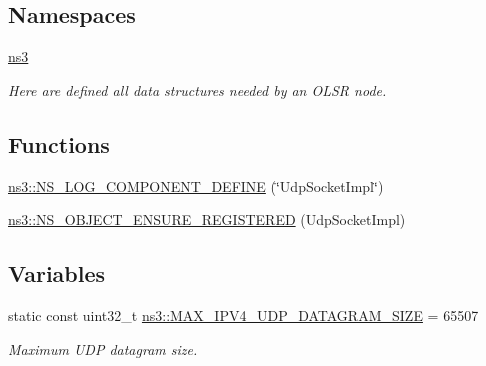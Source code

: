 \subsection*{Namespaces}
\begin{DoxyCompactItemize}
\item 
 \hyperlink{namespacens3}{ns3}
\begin{DoxyCompactList}\small\item\em Here are defined all data structures needed by an O\+L\+SR node. \end{DoxyCompactList}\end{DoxyCompactItemize}
\subsection*{Functions}
\begin{DoxyCompactItemize}
\item 
\hyperlink{namespacens3_a7dd62d2e28bb73942a43c1cc5bb7d31d}{ns3\+::\+N\+S\+\_\+\+L\+O\+G\+\_\+\+C\+O\+M\+P\+O\+N\+E\+N\+T\+\_\+\+D\+E\+F\+I\+NE} (\char`\"{}Udp\+Socket\+Impl\char`\"{})
\item 
\hyperlink{namespacens3_a5bce20e6a77dec0acde9b9850a19ea95}{ns3\+::\+N\+S\+\_\+\+O\+B\+J\+E\+C\+T\+\_\+\+E\+N\+S\+U\+R\+E\+\_\+\+R\+E\+G\+I\+S\+T\+E\+R\+ED} (Udp\+Socket\+Impl)
\end{DoxyCompactItemize}
\subsection*{Variables}
\begin{DoxyCompactItemize}
\item 
static const uint32\+\_\+t \hyperlink{namespacens3_aa58af59d765a0ab7b6d3334147fe60b4}{ns3\+::\+M\+A\+X\+\_\+\+I\+P\+V4\+\_\+\+U\+D\+P\+\_\+\+D\+A\+T\+A\+G\+R\+A\+M\+\_\+\+S\+I\+ZE} = 65507
\begin{DoxyCompactList}\small\item\em Maximum U\+DP datagram size. \end{DoxyCompactList}\end{DoxyCompactItemize}
